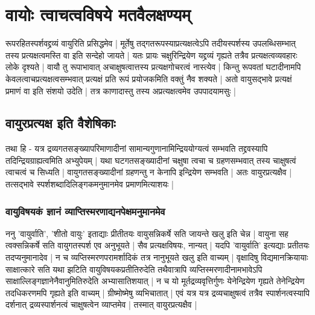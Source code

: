 \section{वायोः त्वाचत्वविषये मतवैलक्षण्यम्}

रूपरहितस्पर्शवद्द्रव्यं वायुरिति प्रसिद्धमेव | मूर्तेषु तद्गतरूपस्याप्रत्यक्षत्वेऽपि तदीयस्पर्शस्य उपलब्धिसम्भात् तस्य प्रत्यक्षत्वमस्ति वा इति सन्देहो जायते | यतः प्रायः चक्षुरिन्द्रियेण यद्द्रव्यं गृह्यते तत्रैव प्रत्यक्षत्वव्यवहारः लोके दृश्यते | वायौ तु रूपाभावात् अचाक्षुषत्वात्तस्य प्रत्यक्षगोचरत्वं नास्त्येव | किन्तु रूपवतां घटादीनामपि केवलत्वाचप्रत्यक्षत्वसम्भवात् प्रत्यक्षं प्रति रूपं प्रयोजकमिति वक्तुं नैव शक्यते | अतो वायुसद्भावे प्रत्यक्षं प्रमाणं वा इति संशयो उदेति | तत्र काणादास्तु तस्य अप्रत्यक्षत्वमेव उपपादयामसुः |

\subsection{वायुरप्रत्यक्ष इति वैशेषिकाः}

तथा हि -  यत्र द्रव्यगतसङ्ख्यापरिमाणादीनां सामान्यगुणानामिन्द्रिययोग्यत्वं सम्भवति तद्द्रवस्यापि तदिन्द्रियग्राह्यत्वमिति अभ्युपेयम् |‌ यथा घटगतसङ्ख्यादीनां चक्षुषा त्वचा च ग्रहणसम्भवात् तस्य चाक्षुषत्वं त्वाचत्वं च सिध्यति | वायुगतसङ्ख्यादीनां ग्रहणन्तु न केनापि इन्द्रियेण सम्भवति | अतः वायुरप्रत्यक्षैव | तत्सद्भावे स्पर्शशब्दादिलिङ्गकमनुमानमेव प्रमाणमित्याशयः |

\subsubsection{वायुविषयकं ज्ञानं व्याप्तिस्मरणाद्यनपेक्षमनुमानमेव}

 ननु 'वायुर्वाति', 'शीतो वायुः' इताद्याः प्रीतीतयः वायुसन्निकर्षे सति जायन्ते खलु इति चेन्न | वायुना सह त्वक्सन्निकर्षे सति वायुगतस्पर्श एव अनुभूयते | सैव प्रत्यक्षविषयः, नान्यत् | यदपि 'वायुर्वाति' इत्यद्याः प्रतीतयः तदप्यनुमानादेव | न च व्यप्तिस्मरणपरामर्शादिकं तत्र नानुभूयते खलु इति वाच्यम् | वृक्षादिषु विद्यमानक्रियायाः साक्षात्कारे सति यथा झटिति वायुविषयकप्रतीतिरुदेति तथैवात्रापि व्यप्तिस्मरणादीनामभावेऽपि साक्षाल्लिङ्गज्ञानेनैवानुमितिरुदेति अभ्यासातिशयात् | न च यो मूर्तद्रव्यवृत्तिर्गुणः येनेन्द्रियेण गृह्यते तेनेन्द्रियेण तदधिकरणमपि गृह्यते इति वाच्यम् | ग्रीष्मोष्मेषु व्यभिचातात् | एवं यत्र यत्र द्रव्यचाक्षुषत्वं तत्रैव स्पार्शनत्वस्यापि दर्शनात् द्रव्यस्पार्शनत्वं चाक्षुषत्वेन व्याप्तमेव | तस्मात् वायुरप्रत्यक्षैव |
 
